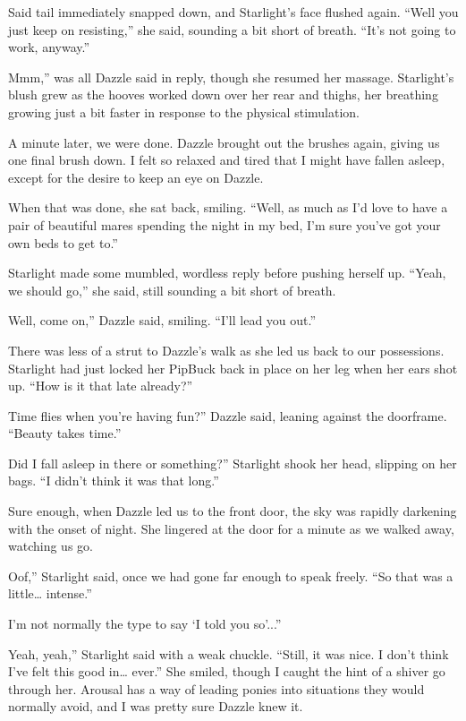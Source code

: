 Said tail immediately snapped down, and Starlight’s face flushed again. “Well you just keep on resisting,” she said, sounding a bit short of breath. “It’s not going to work, anyway.”

\leavevmode{}Mmm,” was all Dazzle said in reply, though she resumed her massage. Starlight’s blush grew as the hooves worked down over her rear and thighs, her breathing growing just a bit faster in response to the physical stimulation.

A minute later, we were done. Dazzle brought out the brushes again, giving us one final brush down. I felt so relaxed and tired that I might have fallen asleep, except for the desire to keep an eye on Dazzle.

When that was done, she sat back, smiling. “Well, as much as I’d love to have a pair of beautiful mares spending the night in my bed, I’m sure you’ve got your own beds to get to.”

Starlight made some mumbled, wordless reply before pushing herself up. “Yeah, we should go,” she said, still sounding a bit short of breath.

\leavevmode{}Well, come on,” Dazzle said, smiling. “I’ll lead you out.”

There was less of a strut to Dazzle’s walk as she led us back to our possessions. Starlight had just locked her PipBuck back in place on her leg when her ears shot up. “How is it that late already?”

\leavevmode{}Time flies when you’re having fun?” Dazzle said, leaning against the doorframe. “Beauty takes time.”

\leavevmode{}Did I fall asleep in there or something?” Starlight shook her head, slipping on her bags. “I didn’t think it was that long.”

Sure enough, when Dazzle led us to the front door, the sky was rapidly darkening with the onset of night. She lingered at the door for a minute as we walked away, watching us go.

\leavevmode{}Oof,” Starlight said, once we had gone far enough to speak freely. “So that was a little… intense.”

\leavevmode{}I’m not normally the type to say ‘I told you so’...”

\leavevmode{}Yeah, yeah,” Starlight said with a weak chuckle. “Still, it was nice. I don’t think I’ve felt this good in… ever.” She smiled, though I caught the hint of a shiver go through her. Arousal has a way of leading ponies into situations they would normally avoid, and I was pretty sure Dazzle knew it.

